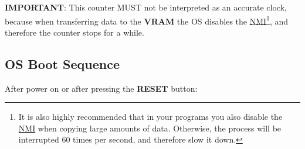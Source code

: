     \textbf{IMPORTANT}: This counter MUST not be interpreted as an accurate
    clock, because when transferring data to the \textbf{VRAM} the OS disables
    the \hyperref[sec:nmi]{NMI}\footnote{It is also highly recommended that in
    your programs you also disable the \hyperref[sec:nmi]{NMI} when copying
    large amounts of data. Otherwise, the process will be interrupted 60 times
    per second, and therefore slow it down.}, and therefore the counter stops
    for a while.

    \subsection{OS Boot Sequence}
    After power on or after pressing the \textbf{RESET} button:

